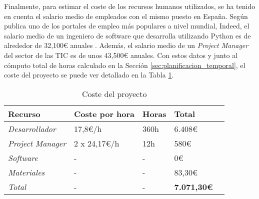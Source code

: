 \bigskip
Finalmente, para estimar el coste de los recursos
humanos utilizados, se ha tenido en cuenta el salario medio de empleados con el mismo puesto en España. Según publica
uno de los portales de empleo más populares a nivel mundial, Indeed, el salario medio de un ingeniero de software que desarrolla
utilizando Python es de alrededor de 32,100€ anuales \cite{indeedsalario}. Además, el salario medio de un \textit{Project Manager}
del sector de las TIC es de unos 43,500€ anuales. Con estos datos y junto al cómputo total de horas calculado en la Sección \ref{sec:planificacion_temporal},
el coste del proyecto se puede ver detallado en la Tabla \ref{tab:costes}.

\bigskip
\begin{table}[H]
	\centering
	\begin{tabular}{|l|l|l|l|l|}
		\rowcolor{udcpink!25}
		\hline
		\small \textbf{Recurso}         & \small \textbf{Coste por hora} & \small \textbf{Horas} & \small \textbf{Total}     \\ \hline
		\small \textit{Desarrollador}   & \small 17,8€/h                 & \small 360h           & \small 6.408€             \\ \hline
		\small \textit{Project Manager} & \small 2 x 24,17€/h            & \small 12h            & \small 580€               \\ \hline
		\small \textit{Software}        & \small -                       & \small -              & \small 0€                 \\ \hline
		\small \textit{Materiales}      & \small -                       & \small -              & \small 83,30€             \\ \hline
		\small \textit{Total}           & \small -                       & \small -              & \small \textbf{7.071,30€} \\ \hline
	\end{tabular}
	\caption{Coste del proyecto}
	\label{tab:costes}
\end{table}
